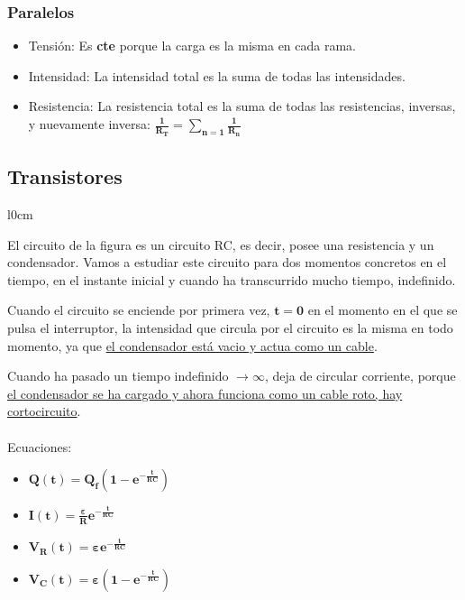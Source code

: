 \subsubsection{Paralelos}
\begin{itemize}
        \item Tensión: Es \textbf{cte} porque la carga es la misma en cada rama.
        \item Intensidad: La intensidad total es la suma de todas las intensidades.
        \item Resistencia: La resistencia total es la suma de todas las resistencias, inversas, y nuevamente inversa: \(\bm{\frac{1}{R_T} = \sum_{n = 1}\frac{1}{R_n}}\)
\end{itemize}
\subsection{Transistores}
\begin{wrapfigure}{l}{0cm}
\end{wrapfigure}
\noindent El circuito de la figura es un circuito RC, es decir, posee una resistencia y un condensador.
Vamos a estudiar este circuito para dos momentos concretos en el tiempo, en el instante inicial y cuando ha transcurrido mucho tiempo, indefinido.
\vspace{.5cm}
\par \noindent Cuando el circuito se enciende por primera vez, \(\bm{t = 0}\) en el momento en el que se pulsa el interruptor, la intensidad que circula por el circuito es la misma en todo momento, ya que \underline{el condensador está vacio y actua como un cable}.
\vspace{.5cm}
\par \hspace{-0.3cm}Cuando ha pasado un tiempo indefinido \(\bm{\rightarrow \infty}\), deja de circular corriente, porque \underline{el condensador se ha cargado y ahora funciona como un cable roto, hay cortocircuito}.
\\
\\
\noindent Ecuaciones:
\begin{itemize}
        \item \(\bm{Q(t)=Q_f(1-e^{-\frac{t}{RC}})}\)
        \item \(\bm{I(t)=\frac{\varepsilon}{R}e^{-\frac{t}{RC}}}\)
        \item \(\bm{V_R(t) = \varepsilon e^{-\frac{t}{RC}}}\)
        \item \(\bm{V_C(t) = \varepsilon(1-e^{-\frac{t}{RC}})}\)
\end{itemize}
